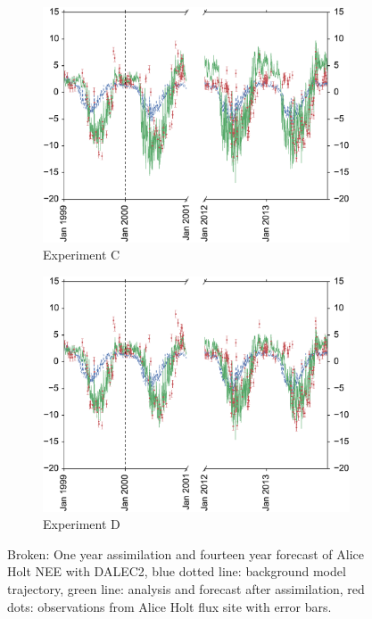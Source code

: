 \documentclass[11pt]{article}
\begin{document}
\begin{figure}
\begin{subfigure}[b]{0.49\textwidth}
        \includegraphics[width=\textwidth]{Cbroke4dvar.eps}
        \caption{Experiment C}
        \label{fig:4dvarBcorR}
    \end{subfigure}
    \begin{subfigure}[b]{0.49\textwidth}
        \includegraphics[width=\textwidth]{Dbroke4dvar.eps}
        \caption{Experiment D}
        \label{fig:4dvaredcBcorR}
    \end{subfigure}
    \caption{Broken: One year assimilation and fourteen year forecast of Alice Holt NEE with DALEC2, blue dotted line: background model trajectory, green line: analysis and forecast after assimilation, red dots: observations from Alice Holt flux site with error bars.}\label{fig:4dvar}
\end{figure}
\end{document}
